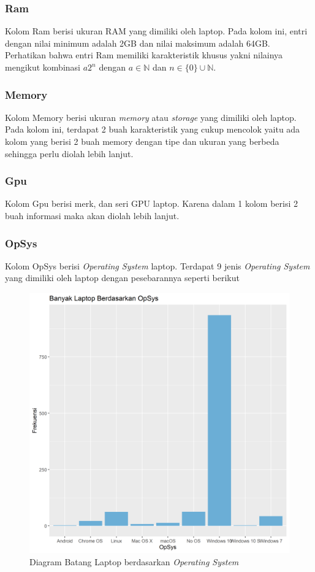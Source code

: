\documentclass[12pt]{article}
\begin{document}
\subsubsection{Ram}
Kolom Ram berisi ukuran RAM yang dimiliki oleh laptop. Pada kolom ini, entri dengan nilai minimum adalah 2GB dan nilai maksimum adalah 64GB. Perhatikan bahwa entri Ram memiliki karakteristik khusus yakni nilainya mengikut kombinasi $a2^n$ dengan $a\in \mathbb{N}$ dan $n \in \{0\} \cup \mathbb{N}$.
\subsubsection{Memory}
Kolom Memory berisi ukuran \textit{memory} atau \textit{storage} yang dimiliki oleh laptop. Pada kolom ini, terdapat 2 buah karakteristik yang cukup mencolok yaitu ada kolom yang berisi 2 buah memory dengan tipe dan ukuran yang berbeda sehingga perlu diolah lebih lanjut. 
\subsubsection{Gpu}
Kolom Gpu berisi merk, dan seri GPU laptop. Karena dalam 1 kolom berisi 2 buah informasi maka akan diolah lebih lanjut. 
\subsubsection{OpSys}
Kolom OpSys berisi \textit{Operating System} laptop. Terdapat 9 jenis \textit{Operating System} yang dimiliki oleh laptop dengan pesebarannya seperti berikut 
\begin{figure}[h!]
    \centering
    \includegraphics[scale = 0.4]{barplot2.png}
    \caption{Diagram Batang Laptop berdasarkan \textit{Operating System}}
    \label{ahay}
\end{figure}
\end{document}
